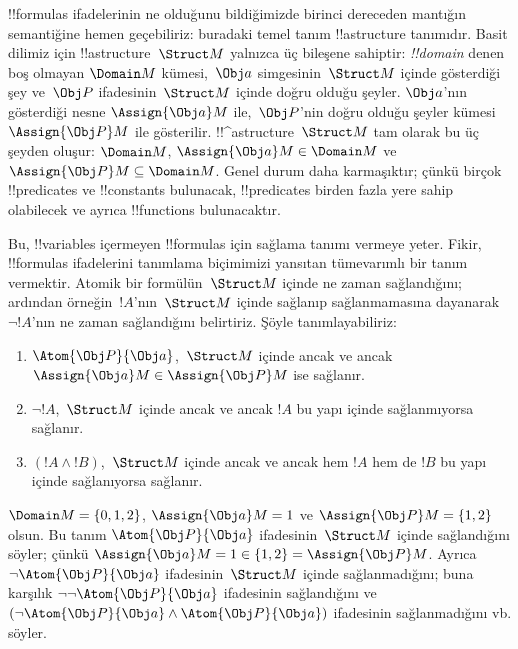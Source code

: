 \documentclass[../../../include/open-logic-section]{subfiles}
\begin{document}


!!{formula}s ifadelerinin ne olduğunu bildiğimizde birinci dereceden
mantığın semantiğine hemen geçebiliriz: buradaki temel tanım
!!a{structure} tanımıdır. Basit dilimiz için !!a{structure}~$\Struct M$
yalnızca üç bileşene sahiptir: \emph{!!{domain}} denen boş olmayan
$\Domain M$ kümesi,~$\Obj a$ simgesinin~$\Struct M$ içinde gösterdiği
şey ve~$\Obj P$ ifadesinin~$\Struct M$ içinde doğru olduğu şeyler.
$\Obj a$'nın gösterdiği nesne $\Assign{\Obj a}M$ ile,~$\Obj P$'nin
doğru olduğu şeyler kümesi $\Assign{\Obj P}M$ ile gösterilir.
!!^a{structure}~$\Struct M$ tam olarak bu üç şeyden oluşur:
$\Domain M$, $\Assign{\Obj a}M\in\Domain M$ ve
$\Assign{\Obj P}M\subseteq\Domain M$. Genel durum daha karmaşıktır;
çünkü birçok !!{predicate}s ve !!{constant}s bulunacak, !!{predicate}s
birden fazla yere sahip olabilecek ve ayrıca !!{function}s bulunacaktır.

Bu, !!{variable}s içermeyen !!{formula}s için sağlama tanımı vermeye
yeter. Fikir, !!{formula}s ifadelerini tanımlama biçimimizi yansıtan
tümevarımlı bir tanım vermektir. Atomik bir formülün~$\Struct M$
içinde ne zaman sağlandığını; ardından örneğin~$!A$'nın~$\Struct M$
içinde sağlanıp sağlanmamasına dayanarak $\lnot !A$'nın ne zaman
sağlandığını belirtiriz. Şöyle tanımlayabiliriz:
\begin{enumerate}
  \item $\Atom{\Obj P}{\Obj a}$,~$\Struct M$ içinde ancak ve ancak
  $\Assign{\Obj a}M\in\Assign{\Obj P}M$ ise sağlanır.
  \item $\lnot !A$,~$\Struct M$ içinde ancak ve ancak $!A$ bu yapı
  içinde sağlanmıyorsa sağlanır.
  \item $(!A\land !B)$,~$\Struct M$ içinde ancak ve ancak hem $!A$
  hem de $!B$ bu yapı içinde sağlanıyorsa sağlanır.
\end{enumerate}
$\Domain M=\{0,1,2\}$, $\Assign{\Obj a}M=1$ ve
$\Assign{\Obj P}M=\{1,2\}$ olsun. Bu tanım
$\Atom{\Obj P}{\Obj a}$ ifadesinin~$\Struct M$ içinde sağlandığını
söyler; çünkü $\Assign{\Obj a}M=1\in\{1,2\}=\Assign{\Obj P}M$.
Ayrıca $\lnot\Atom{\Obj P}{\Obj a}$ ifadesinin~$\Struct M$ içinde
sağlanmadığını; buna karşılık $\lnot\lnot\Atom{\Obj P}{\Obj a}$
ifadesinin sağlandığını ve
$(\lnot\Atom{\Obj P}{\Obj a}\land\Atom{\Obj P}{\Obj a})$ ifadesinin
sağlanmadığını vb. söyler.
\end{document}
